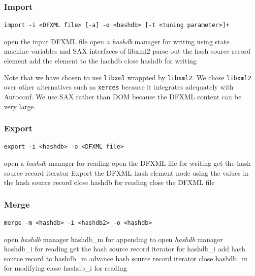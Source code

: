 \documentclass[12pt,twoside]{article}
\newcommand{\hdb}{\emph{hashdb}\xspace}
\begin{document}
\subsubsection{Import}
\begin{small}
\begin{verbatim}
import -i <DFXML file> [-a] -o <hashdb> [-t <tuning parameter>]+
\end{verbatim}
\end{small}
\begin{algorithmic}
\STATE open the input DFXML file
\STATE open a \hdb manager for writing
\STATE using state machine variables and SAX interfaces of libxml2
  \STATE parse out the hash source record element
  \STATE add the element to the hashdb
\ENDFOR
\STATE close hashdb for writing
\end{algorithmic}

Note that we have chosen to use \texttt{libxml} wrappted by \texttt{libxml2}.
We chose \texttt{libxml2} over other alternatives such as \texttt{xerces}
because it integrates adequately with Autoconf.
We use SAX rather than DOM because the DFXML content can be very large.

\subsubsection{Export}
\begin{small}
\begin{verbatim}
export -i <hashdb> -o <DFXML file>
\end{verbatim}
\end{small}
\begin{algorithmic}
\STATE open a \hdb manager for reading
\STATE open the DFXML file for writing
\STATE get the hash source record iterator
  \STATE Export the DFXML hash element node using the values in the hash source record
\ENDFOR
\STATE close hashdb for reading
\STATE close the DFXML file
\end{algorithmic}

\subsubsection{Merge}
\begin{small}
\begin{verbatim}
merge -m <hashdb> -i <hashdb2> -o <hashdb>
\end{verbatim}
\end{small}
\begin{algorithmic}
\STATE open \hdb manager hashdb\_m for appending to
\STATE open \hdb manager hashdb\_i for reading
\STATE get the hash source record iterator for hashdb\_i
  \STATE add hash source record to hashdb\_m
  \STATE advance hash source record iterator
\ENDWHILE
\STATE close hashdb\_m for modifying
\STATE close hashdb\_i for reading
\end{algorithmic}
\end{document}
